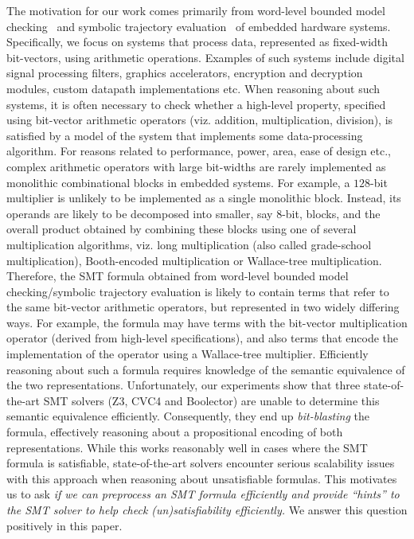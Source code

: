 The motivation for our work comes primarily from word-level bounded
model checking~\cite{cbmc,hwcbmc} and symbolic trajectory
evaluation~\cite{wste} of embedded hardware systems.  Specifically, we
focus on systems that process data, represented as fixed-width
bit-vectors, using arithmetic operations.  Examples of such systems
include digital signal processing filters, graphics accelerators,
encryption and decryption modules, custom datapath implementations
etc.  When reasoning about such systems, it is often necessary to
check whether a high-level property, specified using bit-vector
arithmetic operators (viz. addition, multiplication, division), is
satisfied by a model of the system that implements some
data-processing algorithm.  For reasons related to performance, power,
area, ease of design etc., complex arithmetic operators with large
bit-widths are rarely implemented as monolithic combinational blocks
in embedded systems.  For example, a $128$-bit multiplier is unlikely
to be implemented as a single monolithic block.  Instead, its operands
are likely to be decomposed into smaller, say $8$-bit, blocks, and the
overall product obtained by combining these blocks using one of
several multiplication algorithms, viz. long multiplication (also
called grade-school multiplication), Booth-encoded multiplication or
Wallace-tree multiplication.  Therefore, the SMT formula obtained from
word-level bounded model checking/symbolic trajectory evaluation is
likely to contain terms that refer to the same bit-vector arithmetic
operators, but represented in two widely differing ways.  For example,
the formula may have terms with the bit-vector multiplication operator
(derived from high-level specifications), and also terms that encode
the implementation of the operator using a Wallace-tree multiplier.
Efficiently reasoning about such a formula requires knowledge of the
semantic equivalence of the two representations.  Unfortunately, our
experiments show that three state-of-the-art SMT solvers (Z3, CVC4 and
Boolector) are unable to determine this semantic equivalence
efficiently.  Consequently, they end up \emph{bit-blasting} the
formula, effectively reasoning about a propositional encoding of both
representations.  While this works reasonably well in cases where the
SMT formula is satisfiable, state-of-the-art solvers encounter serious
scalability issues with this approach when reasoning about
unsatisfiable formulas.  This motivates us to ask \emph{if we can
  preprocess an SMT formula efficiently and provide ``hints'' to the
  SMT solver to help check (un)satisfiability efficiently.} We answer
this question positively in this paper.


